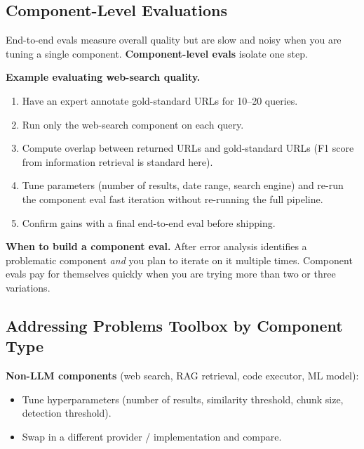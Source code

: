 \documentclass[a4paper,11pt]{article}
\begin{document}
\subsection{Component-Level Evaluations}

End-to-end evals measure overall quality but are slow and noisy when
you are tuning a single component. \textbf{Component-level evals}
isolate one step.

\textbf{Example \textemdash{} evaluating web-search quality.}
\begin{enumerate}[noitemsep, leftmargin=1.4em]
  \item Have an expert annotate gold-standard URLs for 10–20
        queries.
  \item Run only the web-search component on each query.
  \item Compute overlap between returned URLs and gold-standard URLs
        (F1 score from information retrieval is standard here).
  \item Tune parameters (number of results, date range, search
        engine) and re-run the component eval \textemdash{} fast
        iteration without re-running the full pipeline.
  \item Confirm gains with a final end-to-end eval before shipping.
\end{enumerate}

\textbf{When to build a component eval.} After error analysis
identifies a problematic component \emph{and} you plan to iterate on
it multiple times. Component evals pay for themselves quickly when
you are trying more than two or three variations.

\subsection{Addressing Problems \textemdash{} Toolbox by Component Type}

\textbf{Non-LLM components} (web search, RAG retrieval, code
executor, ML model):
\begin{itemize}[noitemsep, leftmargin=1.2em]
  \item Tune hyperparameters (number of results, similarity
        threshold, chunk size, detection threshold).
  \item Swap in a different provider / implementation and compare.
\end{itemize}
\end{document}
